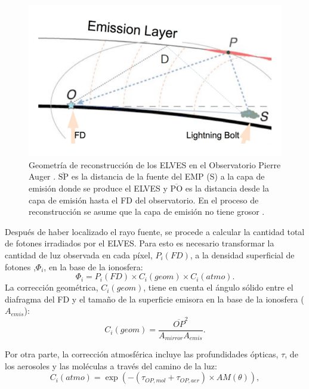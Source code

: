 \documentclass[12pt,oneside,openany,letter]{book}
\begin{document}
\begin{figure}
    \centering
    \includegraphics[scale=0.3]{figures/emission_layer.png}
    \caption[Geometr\'ia de reconstrucci\'on de los ELVES en el Observatorio Pierre Auger]{Geometr\'ia de reconstrucci\'on de los ELVES en el Observatorio Pierre Auger \cite{Mussa2019}. $\overline{\text{SP}}$ es la distancia de la fuente del EMP (S) a la capa de emisi\'on donde se produce el ELVES y $\overline{\text{PO}}$ es la distancia desde la capa de emisi\'on hasta el FD del observatorio. En el proceso de reconstrucci\'on se asume que la capa de emisi\'on no tiene grosor \cite{Mussa2019}.}
    \label{fig:emission_layer}
\end{figure}

Después de haber localizado el rayo fuente, se procede a calcular la cantidad total de fotones irradiados por el ELVES. Para esto es necesario transformar la cantidad de luz observada en cada píxel, $P_i(FD)$, a la densidad superficial de fotones ,$\Phi_i$, en la base de la ionosfera:
\begin{equation}
    \Phi_i=P_i(FD)\times C_i(geom)\times C_i(atmo).
\end{equation}
La corrección geométrica, $C_i(geom)$, tiene en cuenta el ángulo sólido entre el diafragma del FD y el tamaño de la superficie emisora en la base de la ionosfera ($A_{emis}$):
\begin{equation}
    C_i(geom)=\frac{\overline{OP}^{2}}{A_{mirror}A_{emis}}.
\end{equation}

Por otra parte, la corrección atmosférica incluye las profundidades ópticas, $\tau$, de los aerosoles y las moléculas a través del camino de la luz:
\begin{equation}
    C_i(atmo)= \exp\left(-(\tau_{OP, mol}+\tau_{OP, aer})\times AM(\theta)\right),
\end{equation}
\end{document}
